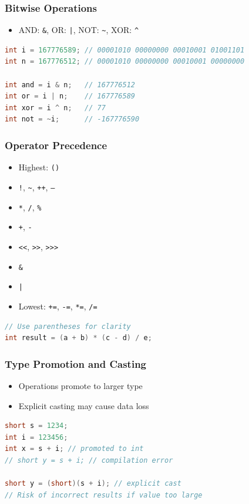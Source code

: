 \documentclass[serif, aspectratio=169]{beamer}
\begin{document}
\begin{frame}[fragile]
\frametitle{Bitwise Operations}
\begin{itemize}
    \item AND: \texttt{\&}, OR: \texttt{|}, NOT: \texttt{\~}, XOR: \texttt{\^}
\end{itemize}
\begin{lstlisting}[language=Java]
int i = 167776589; // 00001010 00000000 00010001 01001101
int n = 167776512; // 00001010 00000000 00010001 00000000

int and = i & n;   // 167776512
int or = i | n;    // 167776589  
int xor = i ^ n;   // 77
int not = ~i;      // -167776590
\end{lstlisting}
\end{frame}

\begin{frame}[fragile]
\frametitle{Operator Precedence}
\begin{itemize}
    \item Highest: \texttt{()}
    \item \texttt{!}, \texttt{\~}, \texttt{++}, \texttt{--}
    \item \texttt{*}, \texttt{/}, \texttt{\%}
    \item \texttt{+}, \texttt{-}
    \item \texttt{<<}, \texttt{>>}, \texttt{>>>}
    \item \texttt{\&}
    \item \texttt{|}
    \item Lowest: \texttt{+=}, \texttt{-=}, \texttt{*=}, \texttt{/=}
\end{itemize}
\begin{lstlisting}[language=Java]
// Use parentheses for clarity
int result = (a + b) * (c - d) / e;
\end{lstlisting}
\end{frame}

\begin{frame}[fragile]
\frametitle{Type Promotion and Casting}
\begin{itemize}
    \item Operations promote to larger type
    \item Explicit casting may cause data loss
\end{itemize}
\begin{lstlisting}[language=Java]
short s = 1234;
int i = 123456;
int x = s + i; // promoted to int
// short y = s + i; // compilation error

short y = (short)(s + i); // explicit cast
// Risk of incorrect results if value too large
\end{lstlisting}
\end{frame}
\end{document}
